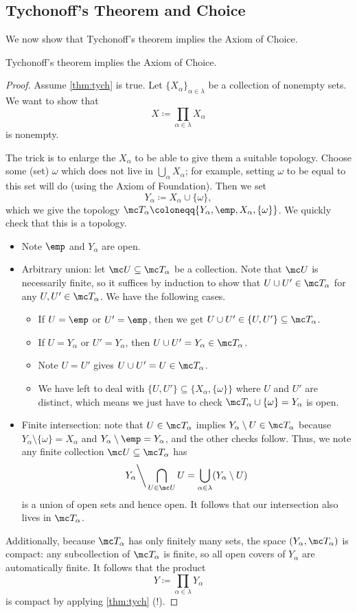 \documentclass[../notes.tex]{subfiles}
\begin{document}
\subsection{Tychonoff's Theorem and Choice}
We now show that Tychonoff's theorem implies the Axiom of Choice.
\begin{theorem}[Kelley]
	Tychonoff's theorem implies the Axiom of Choice.
\end{theorem}
\begin{proof}
	Assume \autoref{thm:tych} is true. Let $\{X_\alpha\}_{\alpha\in\lambda}$ be a collection of nonempty sets. We want to show that
	\[X\coloneqq\prod_{\alpha\in\lambda}X_\alpha\]
	is nonempty.
	
	The trick is to enlarge the $X_\alpha$ to be able to give them a suitable topology. Choose some (set) $\omega$ which does not live in $\bigcup_{\alpha}X_\alpha$; for example, setting $\omega$ to be equal to this set will do (using the Axiom of Foundation). Then we set
	\[Y_\alpha\coloneqq X_\alpha\cup\{\omega\},\]
	which we give the topology $\mc T_\alpha\coloneqq\{Y_\alpha,\emp,X_\alpha,\{\omega\}\}$. We quickly check that this is a topology.
	\begin{itemize}
		\item Note $\emp$ and $Y_\alpha$ are open.
		\item Arbitrary union: let $\mc U\subseteq\mc T_\alpha$ be a collection. Note that $\mc U$ is necessarily finite, so it suffices by induction to show that $U\cup U'\in\mc T_\alpha$ for any $U,U'\in\mc T_\alpha$. We have the following cases.
		\begin{itemize}
			\item If $U=\emp$ or $U'=\emp$, then we get $U\cup U'\in\{U,U'\}\subseteq\mc T_\alpha$.
			\item If $U=Y_\alpha$ or $U'=Y_\alpha$, then $U\cup U'=Y_\alpha\in\mc T_\alpha$.
			\item Note $U=U'$ gives $U\cup U'=U\in\mc T_\alpha$.
			\item We have left to deal with $\{U,U'\}\subseteq\{X_\alpha,\{\omega\}\}$ where $U$ and $U'$ are distinct, which means we just have to check $\mc T_\alpha\cup\{\omega\}=Y_\alpha$ is open.
		\end{itemize}
		\item Finite intersection: note that $U\in\mc T_\alpha$ implies $Y_\alpha\setminus U\in\mc T_\alpha$ because $Y_\alpha\setminus\{\omega\}=X_\alpha$ and $Y_\alpha\setminus\emp=Y_\alpha$, and the other checks follow. Thus, we note any finite collection $\mc U\subseteq\mc T_\alpha$ has
		\[Y_\alpha{\mathbin\bigg\backslash}\bigcap_{U\in\mc U}U=\bigcup_{\alpha\in\lambda}(Y_\alpha\setminus U)\]
		is a union of open sets and hence open. It follows that our intersection also lives in $\mc T_\alpha$.
	\end{itemize}
	Additionally, because $\mc T_\alpha$ has only finitely many sets, the space $(Y_\alpha,\mc T_\alpha)$ is compact: any subcollection of $\mc T_\alpha$ is finite, so all open covers of $Y_\alpha$ are automatically finite. It follows that the product
	\[Y\coloneqq\prod_{\alpha\in\lambda}Y_\alpha\]
	is compact by applying \autoref{thm:tych} (!).


\end{proof}
\end{document}
